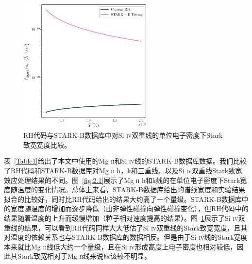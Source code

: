 \begin{figure}
	\centering
	\includegraphics[width=0.6\textwidth]{figs/SB_Si}
	\caption{RH代码与STARK-B数据库中对Si \textsc{iv}双重线的单位电子密度下Stark致宽宽度比较。}\label{fig:2.2}
\end{figure}
表~\ref{Table1}给出了本文中使用的Mg \textsc{ii}和Si \textsc{iv}线的STARK-B数据库数据。我们比较了RH代码和STARK-B数据库对Mg \textsc{ii} h，k和三重线，以及Si \textsc{iv}双重线Stark致宽效应处理结果的不同。图~\ref{fig:2.1}展示了Mg \textsc{ii} h和k线的在单位电子密度下Stark宽度随温度的变化情况。总体上来看，STARK-B数据库给出的谱线宽度和实验结果拟合的比较好，同时比RH代码给出的结果大约高了一个量级。STARK-B数据库中的宽度随温度的增加而逐步降低（由非弹性碰撞向弹性碰撞变化），但RH代码中的结果随着温度的上升而缓慢增加（粒子相对速度提高的结果）。图~\ref{fig:2.2}展示了Si \textsc{iv}双重线的结果，可以看到RH代码同样大大低估了Si \textsc{iv}双重线的Stark致宽宽度，且其对温度的依赖关系也与STARK-B数据库的数据相反。但是由于Si \textsc{iv}线的Stark宽度本来就比Mg \textsc{ii}线低大约一个量级，且在Si \textsc{iv}形成高度上电子密度也相对较低，因此其Stark致宽相对于Mg \textsc{ii}线来说应该较不明显。
